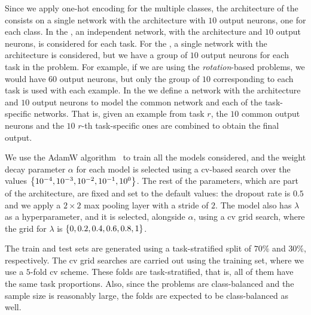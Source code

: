 %
Since we apply one-hot encoding for the multiple classes, the architecture of the  consists on a single network with the  architecture with $10$ output neurons, one for each class.
%
In the , an independent network, with the  architecture and $10$ output neurons, is considered for each task.
%
For the , a single network with the  architecture is considered, but we have a group of $10$ output neurons for each task in the problem. For example, if we are using the \emph{rotation}-based problems, we would have $60$ output neurons, but only the group of $10$ corresponding to each task is used with each example.
%
In the  we define a network with the  architecture and $10$ output neurons to model the common network and each of the task-specific networks. That is, given an example from task $r$, the $10$ common output neurons and the $10$ $r$-th task-specific ones are combined to obtain the final output. 

We use the AdamW algorithm~\citep{LoshchilovH19} to train all the models considered, and the weight decay parameter $\alpha$ for each model is selected using a \acrshort{cv}-based search over the values $\left\{10^{-4}, 10^{-3}, 10^{-2}, 10^{-1}, 10^{0}\right\}$. The rest of the parameters, which are part of the architecture, are fixed and set to the default values: the dropout rate is $0.5$ and we apply a $2\times 2$ max pooling layer with a stride of $2$.
%
The  model also has $\lambda$ as a hyperparameter, and it is selected, alongside $\alpha$, using a \acrshort{cv} grid search, where the grid for $\lambda$ is $\left\{0, 0.2, 0.4, 0.6, 0.8, 1\right\}$.

%
The train and test sets are generated using a task-stratified split of $70\%$ and $30\%$, respectively.
The \acrshort{cv} grid searches are carried out using the training set, where we use a $5$-fold \acrshort{cv} scheme. These folds are task-stratified, that is, all of them have the same task proportions. Also, since the problems are class-balanced and the sample size is reasonably large, the folds are expected to be class-balanced as well.


